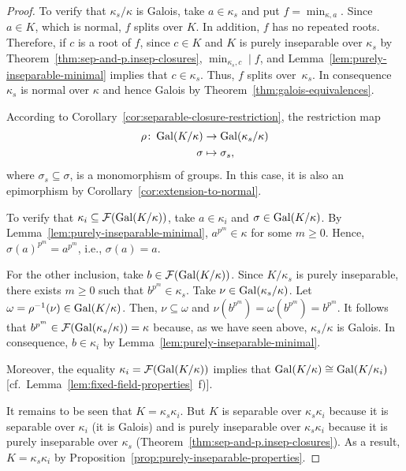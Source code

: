 \begin{proof}
    To verify that $\kappa_s/\kappa$ is Galois, take $a\in\kappa_s$ and put $f=\min_{\kappa,a}$. Since $a\in K$, which is normal, $f$ splits over $K$. In addition, $f$ has no repeated roots. Therefore, if $c$ is a root of $f$, since $c\in K$ and $K$ is purely inseparable over $\kappa_s$ by Theorem~\ref{thm:sep-and-p.insep-closures}, $\min_{\kappa_s,c}\mid f$, and Lemma~\ref{lem:purely-inseparable-minimal} implies that $c\in\kappa_s$. Thus, $f$ splits over~$\kappa_s$. In consequence $\kappa_s$ is normal over $\kappa$ and hence Galois by Theorem~\ref{thm:galois-equivalences}.

    According to Corollary~\ref{cor:separable-closure-restriction}, the restriction map
    \begin{align*}
        \rho\colon\operatorname{Gal}(K/\kappa)&\to\operatorname{Gal}(\kappa_s/\kappa)\\
        \sigma&\mapsto\sigma_s,
    \end{align*}
    where $\sigma_s\subseteq\sigma$, is a monomorphism of groups. In this case, it is also an epimorphism by Corollary~\ref{cor:extension-to-normal}.

    To verify that $\kappa_i\subseteq\mathcal F(\operatorname{Gal}(K/\kappa))$, take $a\in\kappa_i$ and $\sigma\in\operatorname{Gal}(K/\kappa)$. By Lemma~\ref{lem:purely-inseparable-minimal}, $a^{p^m}\in\kappa$ for some $m\ge0$. Hence, $\sigma(a)^{p^m}=a^{p^m}$, i.e., $\sigma(a)=a$.

    For the other inclusion, take $b\in\mathcal F(\operatorname{Gal}(K/\kappa))$. Since $K/\kappa_s$ is purely inseparable, there exists $m\ge0$ such that $b^{p^m}\in\kappa_s$. Take $\nu\in\operatorname{Gal}(\kappa_s/\kappa)$. Let $\omega=\rho^{-1}(\nu)\in\operatorname{Gal}(K/\kappa)$. Then, $\nu\subseteq\omega$ and $\nu(b^{p^m})=\omega(b^{p^m})=b^{p^m}$. It follows that $b^{p^m}\in\mathcal F(\operatorname{Gal}(\kappa_s/\kappa))=\kappa$ because, as we have seen above, $\kappa_s/\kappa$ is Galois. In consequence, $b\in\kappa_i$ by Lemma~\ref{lem:purely-inseparable-minimal}.

    Moreover, the equality $\kappa_i=\mathcal F(\operatorname{Gal}(K/\kappa))$ implies that $\operatorname{Gal}(K/\kappa)\cong\operatorname{Gal}(K/\kappa_i)$ [cf.~Lemma~\ref{lem:fixed-field-properties}~f)].

    It remains to be seen that $K=\kappa_s\kappa_i$. But $K$ is separable over $\kappa_s\kappa_i$ because it is separable over $\kappa_i$ (it is Galois) and is purely inseparable over $\kappa_s\kappa_i$ because it is purely inseparable over $\kappa_s$ (Theorem~\ref{thm:sep-and-p.insep-closures}). As a result, $K=\kappa_s\kappa_i$ by Proposition~\ref{prop:purely-inseparable-properties}. 
\end{proof}

